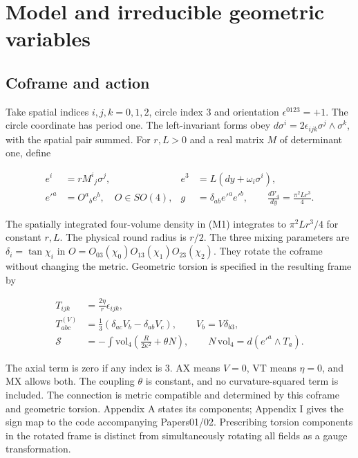 \section{Model and irreducible geometric variables}

\label{sec:2}

\subsection{Coframe and action}

Take spatial indices $i,j,k=0,1,2$, circle index $3$ and orientation $\epsilon^{0123}=+1$. The circle coordinate has period one. The left-invariant forms obey $d\sigma^i=2\epsilon_{ijk}\sigma^j\wedge\sigma^k$, with the spatial pair summed. For $r,L>0$ and a real matrix $M$ of determinant one, define

\begin{equation}\tag{M1}\label{eq:M1}
\begin{aligned}
e^i&=rM^i{}_j\sigma^j,& e^3&=L(dy+\omega_i\sigma^i),\\
e'^a&=O^a{}_b e^b,\quad O\in SO(4),&
g&=\delta_{ab}e'^a e'^b,\qquad
\frac{d\mathcal V_4}{dy}=\frac{\pi^2Lr^3}{4}.
\end{aligned}
\end{equation}

The spatially integrated four-volume density in (M1) integrates to $\pi^2Lr^3/4$ for constant $r,L$. The physical round radius is $r/2$. The three mixing parameters are $\delta_i=\tan\chi_i$ in $O=O_{03}(\chi_0)O_{13}(\chi_1)O_{23}(\chi_2)$. They rotate the coframe without changing the metric. Geometric torsion is specified in the resulting frame by

\begin{equation}\tag{M2}\label{eq:M2}
\begin{aligned}
T_{ijk}&=\frac{2\eta}{r}\epsilon_{ijk},\\
T^{(V)}_{abc}&=\frac13(\delta_{ac}V_b-\delta_{ab}V_c),
\qquad V_b=V\delta_{b3},\\
\mathcal S&=-\int\mathrm{vol}_4
\left(\frac{R}{2\kappa^2}+\theta N\right),\qquad
N\,\mathrm{vol}_4=d(e'^a\wedge T_a).
\end{aligned}
\end{equation}

The axial term is zero if any index is 3. AX means $V=0$, VT means $\eta=0$, and MX allows both. The coupling $\theta$ is constant, and no curvature-squared term is included. The connection is metric compatible and determined by this coframe and geometric torsion. Appendix A states its components; Appendix I gives the sign map to the code accompanying Papers01/02. Prescribing torsion components in the rotated frame is distinct from simultaneously rotating all fields as a gauge transformation.

